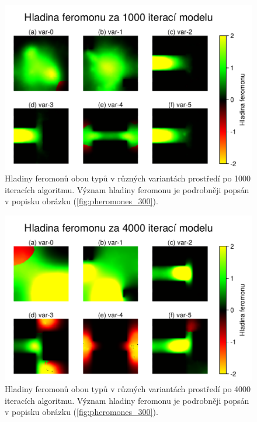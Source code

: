 \documentclass[10pt,a4paper,twocolumn]{article}
\begin{document}
\begin{figure}[tb]
  \centering
  \includegraphics[width=0.98\linewidth]{images/pheromone_levels_1000.pdf}
  \caption{Hladiny feromonů obou typů v různých variantách prostředí 
  po 1000 iteracích algoritmu. Význam hladiny feromonu je podrobněji
  popsán v popisku obrázku (\ref{fig:pheromones_300}).}
  \label{fig:pheromones_1000}
\end{figure}

\begin{figure}[tb]
  \centering
  \includegraphics[width=0.98\linewidth]{images/pheromone_levels_4000.pdf}
  \caption{Hladiny feromonů obou typů v různých variantách prostředí 
  po 4000 iteracích algoritmu. Význam hladiny feromonu je podrobněji
  popsán v popisku obrázku (\ref{fig:pheromones_300}).}
  \label{fig:pheromones_4000}
\end{figure}
\end{document}
